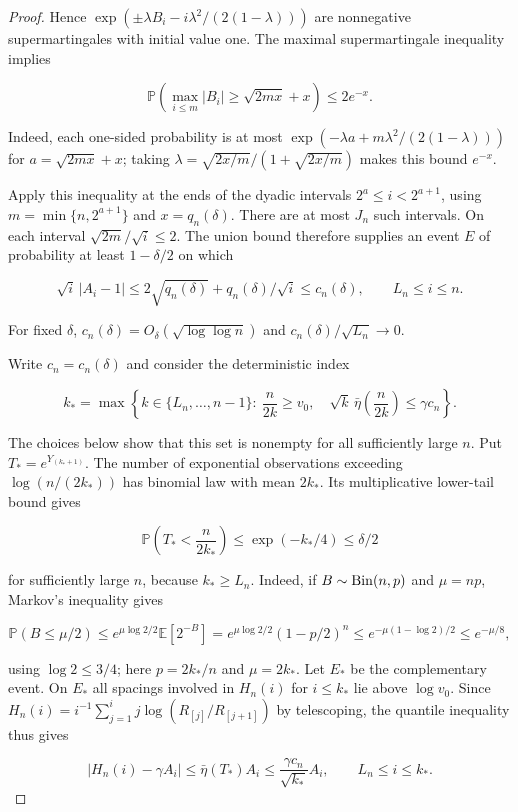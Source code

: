 \documentclass[12pt]{article}
\theoremstyle{plain}
\theoremstyle{definition}
\begin{document}
\begin{proof}
Hence $\exp(\pm\lambda B_i-i\lambda^2/(2(1-\lambda)))$ are nonnegative supermartingales with initial value one. The maximal supermartingale inequality implies

\[
\mathbb P\left(\max_{i\leq m}|B_i|\geq\sqrt{2mx}+x\right)\leq2e^{-x}.
\]

Indeed, each one-sided probability is at most $\exp(-\lambda a+m\lambda^2/(2(1-\lambda)))$ for $a=\sqrt{2mx}+x$; taking $\lambda=\sqrt{2x/m}/(1+\sqrt{2x/m})$ makes this bound $e^{-x}$. 

Apply this inequality at the ends of the dyadic intervals $2^a\leq i<2^{a+1}$, using $m=\min\{n,2^{a+1}\}$ and $x=q_n(\delta)$. There are at most $J_n$ such intervals. On each interval $\sqrt{2m}/\sqrt i\leq2$. The union bound therefore supplies an event $E$ of probability at least $1-\delta/2$ on which

\[
\sqrt i\,|A_i-1|\leq2\sqrt{q_n(\delta)}+q_n(\delta)/\sqrt i\leq c_n(\delta),\qquad L_n\leq i\leq n.
\]

For fixed $\delta$, $c_n(\delta)=O_\delta(\sqrt{\log\log n})$ and $c_n(\delta)/\sqrt{L_n}\to0$. 

Write $c_n=c_n(\delta)$ and consider the deterministic index

\[
k_* =\max\left\{k\in\{L_n,\ldots,n-1\}:\ \frac{n}{2k}\geq v_0,\quad
\sqrt k\,\bar\eta\left(\frac{n}{2k}\right)\leq\gamma c_n\right\}.
\]

The choices below show that this set is nonempty for all sufficiently large $n$. Put $T_*=e^{Y_{(k_*+1)}}$. The number of exponential observations exceeding $\log(n/(2k_*))$ has binomial law with mean $2k_*$. Its multiplicative lower-tail bound gives

\[
\mathbb P\left(T_*<\frac{n}{2k_*}\right)\leq\exp(-k_*/4)\leq\delta/2
\]

for sufficiently large $n$, because $k_*\geq L_n$. Indeed, if $B\sim\operatorname{Bin}(n,p)$ and $\mu=np$, Markov's inequality gives

\[
\mathbb P(B\leq\mu/2)\leq e^{\mu\log2/2}\mathbb E[2^{-B}]
=e^{\mu\log2/2}(1-p/2)^n
\leq e^{-\mu(1-\log2)/2}\leq e^{-\mu/8},
\]

using $\log2\leq3/4$; here $p=2k_*/n$ and $\mu=2k_*$. Let $E_*$ be the complementary event. On $E_*$ all spacings involved in $H_n(i)$ for $i\leq k_*$ lie above $\log v_0$. Since $H_n(i)=i^{-1}\sum_{j=1}^i j\log(R_{[j]}/R_{[j+1]})$ by telescoping, the quantile inequality thus gives

\[
|H_n(i)-\gamma A_i|\leq\bar\eta(T_*)A_i\leq\frac{\gamma c_n}{\sqrt{k_*}}A_i,\qquad L_n\leq i\leq k_*.
\]


\end{proof}
\end{document}
